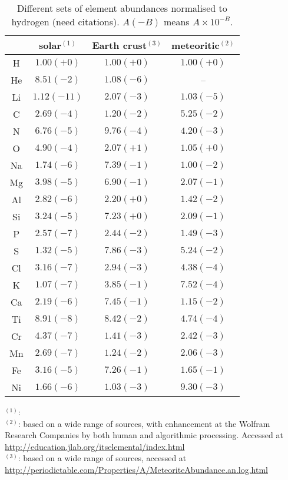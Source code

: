 \documentclass[11pt]{article}
\begin{document}
\begin{table}
\begin{center}
\caption{Different sets of element abundances normalised to hydrogen
  (need citations). $A(-B)$ means $A\times 10^{-B}$.}
\label{tab:eps}
\vspace*{2mm}
\begin{tabular}{cccc}
\hline
     &     solar$^{(1)}$ & Earth crust$^{(3)}$ & meteoritic$^{(2)}$ \\
\hline
 H   & $1.00(+0)$ &   $1.00(+0)$ &   $1.00(+0)$ \\
 He  & $8.51(-2)$ &   $1.08(-6)$ &   -- \\
 Li  & $1.12(-11)$ &  $2.07(-3)$ &   $1.03(-5)$ \\
 C   & $2.69(-4)$ &   $1.20(-2)$ &   $5.25(-2)$ \\
 N   & $6.76(-5)$ &   $9.76(-4)$ &   $4.20(-3)$ \\
 O   & $4.90(-4)$ &   $2.07(+1)$ &   $1.05(+0)$ \\
 Na  & $1.74(-6)$ &   $7.39(-1)$ &   $1.00(-2)$ \\
 Mg  & $3.98(-5)$ &   $6.90(-1)$ &   $2.07(-1)$ \\
 Al  & $2.82(-6)$ &   $2.20(+0)$ &   $1.42(-2)$ \\
 Si  & $3.24(-5)$ &   $7.23(+0)$ &   $2.09(-1)$ \\
 P   & $2.57(-7)$ &   $2.44(-2)$ &   $1.49(-3)$ \\
 S   & $1.32(-5)$ &   $7.86(-3)$ &   $5.24(-2)$ \\
 Cl  & $3.16(-7)$ &   $2.94(-3)$ &   $4.38(-4)$ \\
 K   & $1.07(-7)$ &   $3.85(-1)$ &   $7.52(-4)$ \\
 Ca  & $2.19(-6)$ &   $7.45(-1)$ &   $1.15(-2)$ \\
 Ti  & $8.91(-8)$ &   $8.42(-2)$ &   $4.74(-4)$ \\
 Cr  & $4.37(-7)$ &   $1.41(-3)$ &   $2.42(-3)$ \\
 Mn  & $2.69(-7)$ &   $1.24(-2)$ &   $2.06(-3)$ \\
 Fe  & $3.16(-5)$ &   $7.26(-1)$ &   $1.65(-1)$ \\
 Ni  & $1.66(-6)$ &   $1.03(-3)$ &   $9.30(-3)$ \\
\hline
\end{tabular}
\end{center}
\footnotesize
$^{(1)}$: \citet{Asplund2009} \\
$^{(2)}$: based on a wide range of sources, with enhancement at the
Wolfram Research Companies by both human and algorithmic
processing. Accessed at
\url{http://education.jlab.org/itselemental/index.html} \\
$^{(3)}$: based on a wide range of sources, accessed at \url{http://periodictable.com/Properties/A/MeteoriteAbundance.an.log.html}
\end{table}
\end{document}
